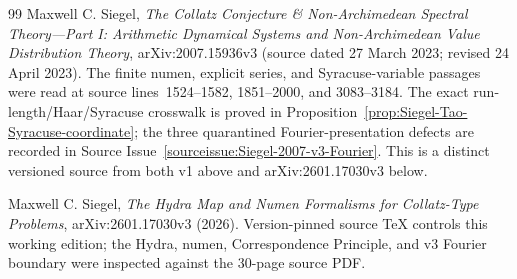 \begin{thebibliography}{99}
Maxwell C. Siegel,
\emph{The Collatz Conjecture \& Non-Archimedean Spectral Theory---Part I:
Arithmetic Dynamical Systems and Non-Archimedean Value Distribution Theory},
arXiv:2007.15936v3 (source dated 27 March 2023; revised 24 April 2023).
The finite numen, explicit series, and Syracuse-variable passages were read
at source lines~1524--1582, 1851--2000, and 3083--3184.  The exact
run-length/Haar/Syracuse crosswalk is proved in
Proposition~\ref{prop:Siegel-Tao-Syracuse-coordinate}; the three quarantined
Fourier-presentation defects are recorded in
Source Issue~\ref{sourceissue:Siegel-2007-v3-Fourier}.  This is a distinct
versioned source from both v1 above and arXiv:2601.17030v3 below.

Maxwell C. Siegel,
\emph{The Hydra Map and Numen Formalisms for Collatz-Type Problems},
arXiv:2601.17030v3 (2026).  Version-pinned source TeX controls this working
edition; the Hydra, numen, Correspondence Principle, and v3 Fourier boundary
were inspected against the 30-page source PDF.


\end{thebibliography}
